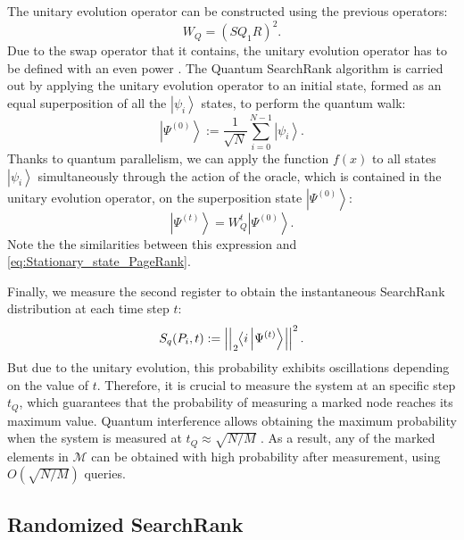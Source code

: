 \documentclass[nofootinbib,aps,prd,reprint,superscriptaddress,floatfix]{revtex4-2}
\begin{document}
The unitary evolution operator can be constructed using the previous operators:
\begin{equation}\label{eq:unitary_evolution}
    W_{Q}=\left(SQ_{1}R\right)^{2}.
\end{equation}
Due to the swap operator that it contains, the unitary evolution operator has to be defined with an even power \cite{Randomized}. The Quantum SearchRank algorithm is carried out by applying the unitary evolution operator to an initial state, formed as an equal superposition of all the $\left|\psi_i\right>$ states, to perform the quantum walk:
\begin{equation}\label{initial}
	\left|\Psi^{(0)}\right> := \frac{1}{\sqrt{N}} \sum_{i=0}^{N-1} \left|\psi_i\right>.
\end{equation}
Thanks to quantum parallelism, we can apply the function $f(x)$ to all states $\left|\psi_i\right>$ simultaneously through the action of the oracle, which is contained in the unitary evolution operator, on the superposition state $\left|\Psi^{(0)}\right>$:
\begin{equation}\label{initial}
	\left|\Psi^{(t)}\right> = W_{Q}^{t}\left|\Psi^{(0)}\right>.
\end{equation}
Note the the similarities between this expression and \eqref{eq:Stationary_state_PageRank}.

Finally, we measure the second register to obtain the instantaneous SearchRank distribution at each time step $t$:
\begin{equation}
	S_q(P_i,t) := \left|\left|\tensor[_2]{\big<i\left|\Psi^{(t)}\right>}{}\right|\right|^2.
\end{equation}
But due to the unitary evolution, this probability exhibits oscillations depending on the value of $t$. Therefore, it is crucial to measure the system at an specific step $t_Q$, which guarantees that the probability of measuring a marked node reaches its maximum value. Quantum interference allows obtaining the maximum probability when the system is measured at $t_Q\approx\sqrt{N/M}$ \cite{Searchrank}. As a result, any of the marked elements in $\mathcal{M}$ can be obtained with high probability after measurement, using $O(\sqrt{N/M})$ queries.

\subsection{Randomized SearchRank}\label{subsec:Randomized_SearchRank}
\end{document}
